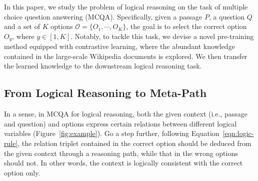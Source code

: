 




In this paper, we study the problem of logical reasoning on the task of multiple choice question answering (MCQA). 
Specifically, given a passage $P$, a question $Q$ and a set of $K$ options $\mathcal{O}=\{O_1,\cdots,O_K\}$, the goal is to select the correct option $O_y$, where $y\in[1,K]$.
Notably, to tackle this task, we devise a novel pre-training method equipped with contrastive learning, where the abundant knowledge contained in the large-scale Wikipedia documents is explored.
We then transfer the learned knowledge to the downstream logical reasoning task.


\subsection{From Logical Reasoning to Meta-Path}



In a sense, in MCQA for logical reasoning, both the given context (i.e., passage and question) and options express certain relations between different logical variables (Figure~\ref{fig:example}). 
Go a step further, following Equation~\ref{eqn:logic-rule}, the relation triplet contained in the correct option should be deduced from the given context through a reasoning path,
while that in the wrong options should not. 
In other words, the context is logically consistent with the correct option only.








